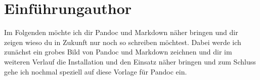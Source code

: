 \documentclass[
    12pt,
    a4paper,
            ngerman,
        bibliography=totocnumbered,
    listof=totocnumbered
]{scrartcl}
\begin{document}
{

\setcounter{tocdepth}{3}

\renewcommand{\cfttabpresnum}{Tab. }
\renewcommand{\cftfigpresnum}{Abb. }
\settowidth{\cfttabnumwidth}{Abb. 10\quad}
\settowidth{\cftfignumwidth}{Abb. 10\quad}

\singlespacing
{}
\renewcommand{\contentsname}{I Inhaltsverzeichnis}
{}
\addtocounter{section}{1}
\tableofcontents
\pagebreak
}




\renewcommand{\sectionmark}[1]{\markright{#1}}
\renewcommand{\subsectionmark}[1]{}
\renewcommand{\subsubsectionmark}[1]{}
\rhead{} %

\onehalfspacing
\renewcommand{\thesection}{\arabic{section}}
\renewcommand{\theHsection}{\arabic{section}}
\setcounter{section}{0}
\setcounter{page}{1}



\hypertarget{einfuxfchrungauthor}{%
\section{Einführungauthor}\label{einfuxfchrungauthor}}

Im Folgenden möchte ich dir Pandoc und Markdown näher bringen und dir
zeigen wieso du in Zukunft nur noch so schreiben möchtest. Dabei werde
ich zunächst ein grobes Bild von Pandoc und Markdown zeichnen und dir im
weiteren Verlauf die Installation und den Einsatz näher bringen und zum
Schluss gehe ich nochmal speziell auf diese Vorlage für Pandoc ein.
\end{document}
